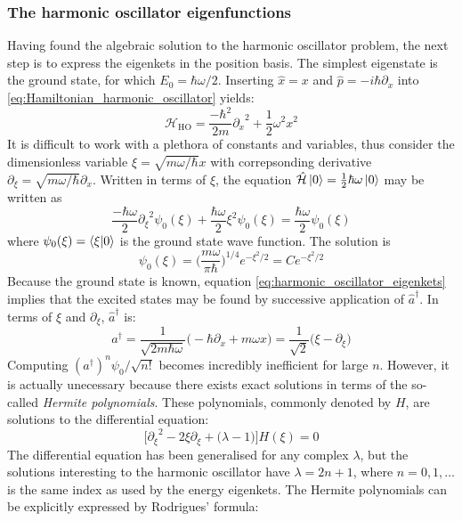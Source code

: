 \documentclass[nofootinbib,reprint,english]{revtex4-1}
\newcommand{\hatHH}{\hat{\mathcal{H}}}
\newcommand{\HH}{\mathcal{H}}
\begin{document}
\subsubsection{The harmonic oscillator eigenfunctions}
Having found the algebraic solution to the harmonic oscillator problem, the next step is to express the eigenkets in the position basis. The simplest eigenstate is the ground state, for which \(E_0=\hbar\omega/2\). Inserting \(\hat{x}=x\) and \(\hat{p}=-i\hbar\partial_x\) into \eqref{eq:Hamiltonian_harmonic_oscillator} yields:
\[\HH_\text{HO}=\frac{-\hbar^2}{2m}{\partial_x}^2+\frac{1}{2}\omega^2x^2\]
It is difficult to work with a plethora of constants and variables, thus consider the dimensionless variable \(\xi=\sqrt{m\omega/\hbar}x\) with correpsonding derivative \(\partial_\xi=\sqrt{m\omega/\hbar}\partial_x\). Written in terms of \(\xi\), the equation \(\hatHH\ket{0}=\frac{1}{2}\hbar\omega\ket{0}\) may be written as
\[\frac{-\hbar\omega}{2}{\partial_\xi}^2\psi_0(\xi)+\frac{\hbar\omega}{2}\xi^2\psi_0(\xi)=\frac{\hbar\omega}{2}\psi_0(\xi)\]
where \(\psi_0(\xi)=\braket{\xi}{0}\) is the ground state wave function. The solution is
\begin{equation}\label{eq:harmonic_oscillator_ground_state_position_basis}
\psi_0(\xi)=\bigg(\frac{m\omega}{\pi\hbar}\bigg)^{1/4}e^{-\xi^2/2}=Ce^{-\xi^2/2}
\end{equation}
Because the ground state is known, equation \eqref{eq:harmonic_oscillator_eigenkets} implies that the excited states may be found by successive application of \(\hat{a}^\dagger\). In terms of \(\xi\) and \(\partial_\xi\), \(\hat{a}^\dagger\) is:
\[a^\dagger=\frac{1}{\sqrt{2m\hbar\omega}}\big(-\hbar\partial_x+m\omega x\big)=\frac{1}{\sqrt{2}}\big(\xi-\partial_\xi\big)\]
Computing \((a^\dagger)^n\psi_0/\sqrt{n!}\) becomes incredibly inefficient for large \(n\). However, it is actually unecessary because there exists exact solutions in terms of the so-called \emph{Hermite polynomials}. These polynomials, commonly denoted by \(H\), are solutions to the differential equation:
\begin{equation}\label{eq:Hermite_differential_equation}
\bigg[{\partial_\xi}^2-2\xi\partial_\xi+\big(\lambda-1\big)\bigg]H(\xi)=0
\end{equation}
The differential equation has been generalised for any complex \(\lambda\), but the solutions interesting to the harmonic oscillator have \(\lambda=2n+1\), where \(n=0,1,\ldots\) is the same index as used by the energy eigenkets. The Hermite polynomials can be explicitly expressed by Rodrigues' formula:
\end{document}
